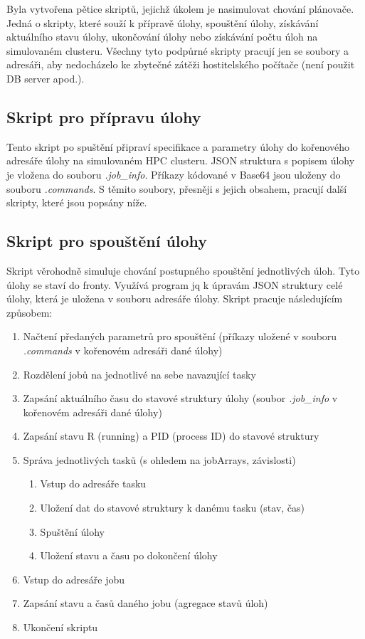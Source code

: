\hfill \break


Byla vytvořena pětice skriptů, jejichž úkolem je nasimulovat chování plánovače. Jedná o skripty, které souží k přípravě úlohy, spouštění úlohy, získávání aktuálního stavu úlohy, ukončování úlohy nebo získávání počtu úloh na simulovaném clusteru. Všechny tyto podpůrné skripty pracují jen se soubory a adresáři, aby nedocházelo ke zbytečné zátěži hostitelského počítače (není použit DB server apod.). 

\subsection{Skript pro přípravu úlohy}
Tento skript po spuštění připraví specifikace a parametry úlohy do kořenového adresáře úlohy na simulovaném HPC clusteru. JSON struktura s popisem úlohy je vložena do souboru \emph{.job\_info}. Příkazy kódované v Base64 jsou uloženy do souboru \emph{.commands}. S těmito soubory, přesněji s jejich obsahem, pracují další skripty, které jsou popsány níže.


\subsection{Skript pro spouštění úlohy}
Skript věrohodně simuluje chování postupného spouštění jednotlivých úloh. Tyto úlohy se staví do fronty. Využívá program jq k úpravám JSON struktury celé úlohy, která je uložena v souboru adresáře úlohy. Skript pracuje následujícím způsobem:

\begin{enumerate}
	\item Načtení předaných parametrů pro spouštění (příkazy uložené v souboru \emph{.commands} v kořenovém adresáři dané úlohy)
	\item Rozdělení jobů na jednotlivé na sebe navazující tasky
	\item Zapsání aktuálního času do stavové struktury úlohy (soubor \emph{.job\_info} v kořenovém adresáři dané úlohy)
	\item Zapsání stavu R (running) a PID (process ID) do stavové struktury
	\item Správa jednotlivých tasků (s ohledem na jobArrays, závislosti)
	\begin{enumerate}
		\item Vstup do adresáře tasku
		\item Uložení dat do stavové struktury k danému tasku (stav, čas)
		\item Spuštění úlohy
		\item Uložení stavu a času po dokončení úlohy
	\end{enumerate}
	\item Vstup do adresáře jobu
	\item Zapsání stavu a časů daného jobu (agregace stavů úloh)
	\item Ukončení skriptu
\end{enumerate}

